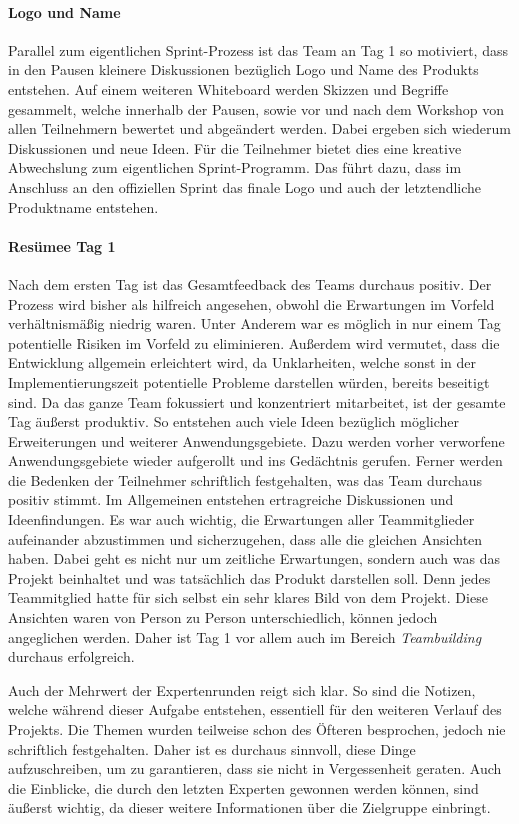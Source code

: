 \paragraph{Logo und Name}
Parallel zum eigentlichen Sprint-Prozess ist das Team an Tag 1 so motiviert, dass in den Pausen kleinere Diskussionen bezüglich Logo und Name des Produkts entstehen. Auf einem weiteren Whiteboard werden Skizzen und Begriffe gesammelt, welche innerhalb der Pausen, sowie vor und nach dem Workshop von allen Teilnehmern bewertet und abgeändert werden. Dabei ergeben sich wiederum Diskussionen und neue Ideen. Für die Teilnehmer bietet dies eine kreative Abwechslung zum eigentlichen Sprint-Programm. Das führt dazu, dass im Anschluss an den offiziellen Sprint das finale Logo und auch der letztendliche Produktname entstehen.

\paragraph{Resümee Tag 1}
Nach dem ersten Tag ist das Gesamtfeedback des Teams durchaus positiv. Der Prozess wird bisher als hilfreich angesehen, obwohl die Erwartungen im Vorfeld verhältnismäßig niedrig waren. Unter Anderem war es möglich in nur einem Tag potentielle Risiken im Vorfeld zu eliminieren. Außerdem wird vermutet, dass die Entwicklung allgemein erleichtert wird, da Unklarheiten, welche sonst in der Implementierungszeit potentielle Probleme darstellen würden, bereits beseitigt sind. Da das ganze Team fokussiert und konzentriert mitarbeitet, ist der gesamte Tag äußerst produktiv. So entstehen auch viele Ideen bezüglich möglicher Erweiterungen und weiterer Anwendungsgebiete. Dazu werden vorher verworfene Anwendungsgebiete wieder aufgerollt und ins Gedächtnis gerufen. Ferner werden die Bedenken der Teilnehmer schriftlich festgehalten, was das Team durchaus positiv stimmt. Im Allgemeinen entstehen ertragreiche Diskussionen und Ideenfindungen. Es war auch wichtig, die Erwartungen aller Teammitglieder aufeinander abzustimmen und sicherzugehen, dass alle die gleichen Ansichten haben. Dabei geht es nicht nur um zeitliche Erwartungen, sondern auch was das Projekt beinhaltet und was tatsächlich das Produkt darstellen soll. Denn jedes Teammitglied hatte für sich selbst ein sehr klares Bild von dem Projekt. Diese Ansichten waren von Person zu Person unterschiedlich, können jedoch angeglichen werden. Daher ist Tag 1 vor allem auch im Bereich \textit{Teambuilding} durchaus erfolgreich.

Auch der Mehrwert der Expertenrunden reigt sich klar. So sind die Notizen, welche während dieser Aufgabe entstehen, essentiell für den weiteren Verlauf des Projekts. Die Themen wurden teilweise schon des Öfteren besprochen, jedoch nie schriftlich festgehalten. Daher ist es durchaus sinnvoll, diese Dinge aufzuschreiben, um zu garantieren, dass sie nicht in Vergessenheit geraten. Auch die Einblicke, die durch den letzten Experten gewonnen werden können, sind äußerst wichtig, da dieser weitere Informationen über die Zielgruppe einbringt.

